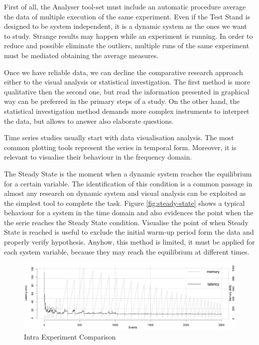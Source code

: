 First of all, the Analyser tool-set must include an automatic procedure average the data of multiple execution of the same experiment. Even if the Test Stand is designed to be system independent, it is a dynamic system as the ones we want to study. Strange results may happen while an experiment is running. In order to reduce and possible eliminate the outliers, multiple runs of the same experiment must be mediated obtaining the average measures. 

Once we have reliable data, we can decline the comparative research approach either to the visual analysis or statistical investigation. The first method is more qualitative then the second one, but read the information presented in graphical way can be preferred in the primary steps of a study. On the other hand, the statistical investigation method demands more complex instruments to interpret the data, but allows to answer also elaborate questions.

Time series studies usually start with data visualisation analysis. The most common plotting tools represent the series in temporal form. Moreover, it is relevant to visualise their behaviour in the frequency domain. 

The Steady State is the moment when a dynamic system reaches the equilibrium for a certain variable. The identification of this condition is a common passage in almost any research on dynamic system and visual analysis can be exploited as the simplest tool to complete the task. Figure \ref{fig:steady-state} shows a typical behaviour for a system in the time domain and also evidences the point when the the serie reaches the Steady State condition. Visualise the point of when Steady State is reached is useful to exclude the initial warm-up period form the data and properly verify hypothesis. Anyhow, this method is limited, it must be applied for each system variable, because they may reach the equilibrium at different times.

\begin{figure}[tbh]
  \centering
	\includegraphics[width=0.80\linewidth]{images/comp-intra}
	\caption{Intra Experiment Comparison} 
  	\label{fig:comp-intra}
\end{figure}

